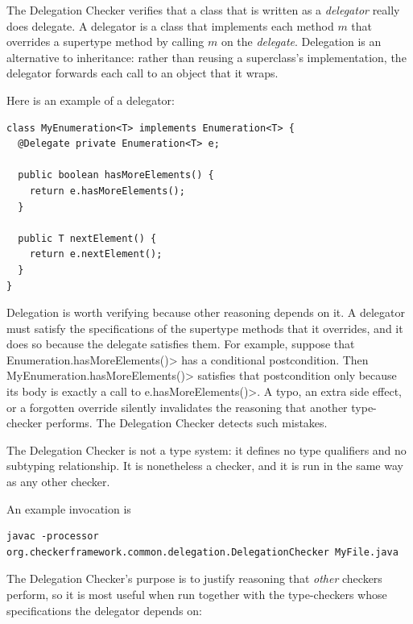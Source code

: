 
The Delegation Checker verifies that a class that is written as a
\emph{delegator} really does delegate.  A delegator is a class that
implements each method $m$ that overrides a supertype method by calling $m$
on the \emph{delegate}.  Delegation
is an alternative to
inheritance:  rather than reusing a superclass's implementation, the
delegator forwards each call to an object that it wraps.

Here is an example of a delegator:

\begin{Verbatim}
class MyEnumeration<T> implements Enumeration<T> {
  @Delegate private Enumeration<T> e;

  public boolean hasMoreElements() {
    return e.hasMoreElements();
  }

  public T nextElement() {
    return e.nextElement();
  }
}
\end{Verbatim}

Delegation is worth verifying because other reasoning depends on it.  A
delegator must satisfy the specifications of the supertype methods that it
overrides, and it does so because the delegate satisfies them.  For
example, suppose that \<Enumeration.hasMoreElements()> has a conditional
postcondition.  Then \<MyEnumeration.hasMoreElements()> satisfies that
postcondition only because its body is exactly a call to
\<e.hasMoreElements()>.  A typo, an extra side effect, or a forgotten
override silently invalidates the reasoning that another type-checker
performs.  The Delegation Checker detects such mistakes.

The Delegation Checker is not a type system:  it defines no type
qualifiers and no subtyping relationship.  It is nonetheless a checker, and
it is run in the same way as any other checker.



An example invocation is

\begin{Verbatim}
javac -processor org.checkerframework.common.delegation.DelegationChecker MyFile.java
\end{Verbatim}

The Delegation Checker's purpose is to justify reasoning that
\emph{other} checkers perform, so it is most useful when run together with
the type-checkers whose specifications the delegator depends on:

